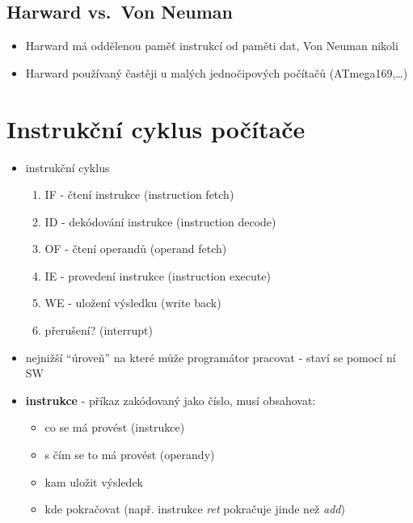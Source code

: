 \documentclass{szzclass}
\providecommand{\tightlist}{%
  \setlength{\itemsep}{0pt}\setlength{\parskip}{0pt}}
\begin{document}
\hypertarget{harward-vs.-von-neuman}{%
\subsection{Harward vs.~Von Neuman}\label{harward-vs.-von-neuman}}

\begin{itemize}
\tightlist
\item
  Harward má oddělenou paměť instrukcí od paměti dat, Von Neuman nikoli
\item
  Harward používaný častěji u malých jednočipových počítačů (ATmega169,\nolinebreak \ldots)
\end{itemize}

\hypertarget{instrukux10dnuxed-cyklus-poux10duxedtaux10de}{%
\section{Instrukční cyklus
počítače}\label{instrukux10dnuxed-cyklus-poux10duxedtaux10de}}

\begin{itemize}
\tightlist
\item
  instrukční cyklus

  \begin{enumerate}
  \def\labelenumi{\arabic{enumi}.}
  \tightlist
  \item
    IF - čtení instrukce (instruction fetch)
  \item
    ID - dekódování instrukce (instruction decode)
  \item
    OF - čtení operandů (operand fetch)
  \item
    IE - provedení instrukce (instruction execute)
  \item
    WE - uložení výsledku (write back)
  \item
    přerušení? (interrupt)
  \end{enumerate}
\item
  nejnižší ``úroveň'' na které může programátor pracovat - staví se
  pomocí ní SW
\item
  \textbf{instrukce} - příkaz zakódovaný jako číslo, musí obsahovat:

  \begin{itemize}
  \tightlist
  \item
    co se má provést (instrukce)
  \item
    s čím se to má provést (operandy)
  \item
    kam uložit výsledek
  \item
    kde pokračovat (např. instrukce \emph{ret} pokračuje jinde než
    \emph{add})
  \end{itemize}
\end{itemize}
\end{document}
